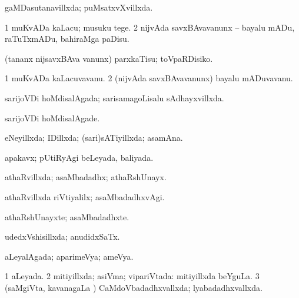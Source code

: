 {{\bentry
{} 
\gl{\gu}
\expl{}
\bmng
gaMDasutanavillxda; puMsatxvXvillxda. 
\emng
\eentry

\bentry
{} 
\gl{\sakirx}
\expl{}
\bmng
\bnum
\num{1} muKvADa kaLacu; musuku tege. 
\num{2} nijvAda savxBAvavanunx -- bayalu mADu, raTuTxmADu, bahiraMga paDisu. 
\enum
\emng

\noindent 
\gl{\akirx}
\expl{}
\bmng
(tananx nijsavxBAva \mo vanunx) parxkaTisu; toVpaRDisiko. 
\emng
\eentry

\bentry
{} 
\gl{\nA}
\expl{}
\bmng
\bnum
\num{1} muKvADa kaLacuvavanu. 
\num{2} (nijvAda savxBAvavanunx) bayalu mADuvavanu. 
\enum
\emng
\eentry

\bentry
{} 
\gl{\gu}
\expl{}
\bmng
sarijoVDi hoMdisalAgada; sarisamagoLisalu sAdhayxvillxda. 
\emng
\eentry

\bentry
{} 
\gl{\kirxvi}
\expl{}
\bmng
sarijoVDi hoMdisalAgade. 
\emng
\eentry

\bentry
{} 
\gl{\gu}
\expl{}
\bmng
eNeyillxda; IDillxda; (sari)sATiyillxda; asamAna. 
\emng
\eentry

\bentry
{} 
\gl{\gu}
\expl{}
\bmng
apakavx; pUtiRyAgi beLeyada, baliyada. 
\emng
\eentry

\bentry
{} 
\gl{\gu}
\expl{}
\bmng
athaRvillxda; asaMbadadhx; athaRshUnayx. 
\emng
\eentry

\bentry
{} 
\gl{\kirxvi}
\expl{}
\bmng
athaRvillxda riVtiyalilx; asaMbadadhxvAgi. 
\emng
\eentry

\bentry
{} 
\gl{\nA}
\expl{}
\bmng
athaRshUnayxte; asaMbadadhxte. 
\emng
\eentry

\bentry
{} 
\gl{\gu}
\bmng
udedxVshisillxda; anudidxSaTx. 
\emng
\eentry

\bentry
{} 
\gl{\gu}
\expl{}
\bmng
aLeyalAgada; aparimeVya; ameVya. 
\emng
\eentry

\bentry
{} 
\gl{\gu}
\expl{}
\bmng
\bnum
\num{1} aLeyada. 
\num{2} mitiyillxda; asiVma; vipariVtada:  mitiyillxda beYguLa. 
\num{3} (saMgiVta, kavanagaLa \vi) CaMdoVbadadhxvallxda; lyabadadhxvallxda. 
\enum
\emng
\eentry

}}
